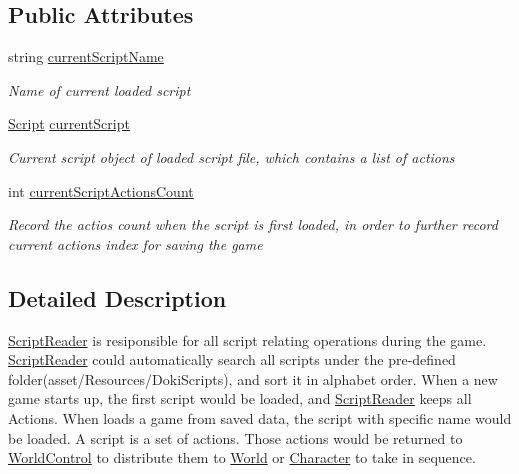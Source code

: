 \subsection*{Public Attributes}
\begin{DoxyCompactItemize}
\item 
string \hyperlink{class_script_reader_a3283923dbeb9c29dedec2f76fee03709}{current\+Script\+Name}
\begin{DoxyCompactList}\small\item\em Name of current loaded script \end{DoxyCompactList}\item 
\hyperlink{classdoki_script_setting_1_1_script}{Script} \hyperlink{class_script_reader_a91937ac5ebccf66a8de49c27cde37b4a}{current\+Script}
\begin{DoxyCompactList}\small\item\em Current script object of loaded script file, which contains a list of actions \end{DoxyCompactList}\item 
int \hyperlink{class_script_reader_a48c647f1adf56637f27727921e9aef6f}{current\+Script\+Actions\+Count}
\begin{DoxyCompactList}\small\item\em Record the actios count when the script is first loaded, in order to further record current action\textquotesingle{}s index for saving the game \end{DoxyCompactList}\end{DoxyCompactItemize}


\subsection{Detailed Description}
\hyperlink{class_script_reader}{Script\+Reader} is resiponsible for all script relating operations during the game. \hyperlink{class_script_reader}{Script\+Reader} could automatically search all scripts under the pre-\/defined folder(asset/\+Resources/\+Doki\+Scripts), and sort it in alphabet order. When a new game starts up, the first script would be loaded, and \hyperlink{class_script_reader}{Script\+Reader} keeps all Actions. When loads a game from saved data, the script with specific name would be loaded. A script is a set of actions. Those actions would be returned to \hyperlink{class_world_control}{World\+Control} to distribute them to \hyperlink{class_world}{World} or \hyperlink{class_character}{Character} to take in sequence. 




